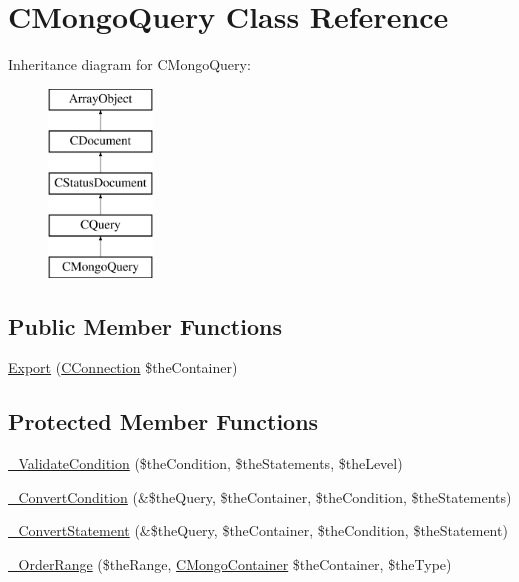 \hypertarget{class_c_mongo_query}{\section{C\-Mongo\-Query Class Reference}
\label{class_c_mongo_query}
}
Inheritance diagram for C\-Mongo\-Query\-:\begin{figure}[H]
\begin{center}
\leavevmode
\includegraphics[height=5.000000cm]{class_c_mongo_query}
\end{center}
\end{figure}
\subsection*{Public Member Functions}
\begin{DoxyCompactItemize}
\item 
\hyperlink{class_c_mongo_query_a8fb40265adf169720a6f175212ef6b09}{Export} (\hyperlink{class_c_connection}{C\-Connection} \$the\-Container)
\end{DoxyCompactItemize}
\subsection*{Protected Member Functions}
\begin{DoxyCompactItemize}
\item 
\hyperlink{class_c_mongo_query_a651af70656cb9894ef1885a711a0c141}{\-\_\-\-Validate\-Condition} (\$the\-Condition, \$the\-Statements, \$the\-Level)
\item 
\hyperlink{class_c_mongo_query_a8cda9306ac308f5c33456e77de004ebb}{\-\_\-\-Convert\-Condition} (\&\$the\-Query, \$the\-Container, \$the\-Condition, \$the\-Statements)
\item 
\hyperlink{class_c_mongo_query_a1f381db3f898f4c9cd333ffd2e3e989b}{\-\_\-\-Convert\-Statement} (\&\$the\-Query, \$the\-Container, \$the\-Condition, \$the\-Statement)
\item 
\hyperlink{class_c_mongo_query_a32fd372e1c39add42d078441eda3f1c3}{\-\_\-\-Order\-Range} (\$the\-Range, \hyperlink{class_c_mongo_container}{C\-Mongo\-Container} \$the\-Container, \$the\-Type)
\end{DoxyCompactItemize}
